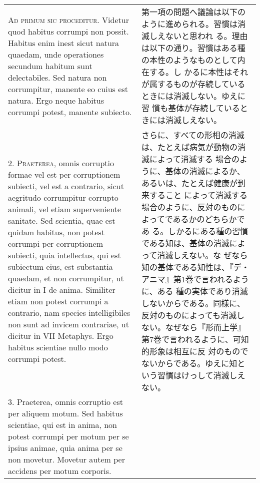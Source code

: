 \documentclass[10pt]{jsarticle} %
\begin{document}
\begin{longtable}{p{21em}p{21em}}


{\scshape Ad primum sic proceditur}. Videtur quod habitus corrumpi non
possit. Habitus enim inest sicut natura quaedam, unde operationes
secundum habitum sunt delectabiles. Sed natura non corrumpitur,
manente eo cuius est natura. Ergo neque habitus corrumpi potest,
manente subiecto.

&

第一項の問題へ議論は以下のように進められる。習慣は消滅しえないと思われ
る。理由は以下の通り。習慣はある種の本性のようなものとして内在する。し
かるに本性はそれが属するものが存続しているときには消滅しない。ゆえに習
慣も基体が存続しているときには消滅しえない。

\\



2. {\scshape Praeterea}, omnis corruptio formae vel est per
corruptionem subiecti, vel est a contrario, sicut aegritudo
corrumpitur corrupto animali, vel etiam superveniente sanitate. Sed
scientia, quae est quidam habitus, non potest corrumpi per
corruptionem subiecti, quia intellectus, qui est subiectum eius, est
substantia quaedam, et non corrumpitur, ut dicitur in I de
anima. Similiter etiam non potest corrumpi a contrario, nam species
intelligibiles non sunt ad invicem contrariae, ut dicitur in VII
Metaphys. Ergo habitus scientiae nullo modo corrumpi potest.


&

さらに、すべての形相の消滅は、たとえば病気が動物の消滅によって消滅する
場合のように、基体の消滅によるか、あるいは、たとえば健康が到来すること
によって消滅する場合のように、反対のものによってであるかのどちらかであ
る。しかるにある種の習慣である知は、基体の消滅によって消滅しえない。な
ぜなら知の基体である知性は、『デ・アニマ』第1巻で言われるように、ある
種の実体であり消滅しないからである。同様に、反対のものによっても消滅し
ない。なぜなら『形而上学』第7巻で言われるように、可知的形象は相互に反
対のものでないからである。ゆえに知という習慣はけっして消滅しえない。



\\



3. Praeterea, omnis corruptio est per aliquem motum. Sed habitus
scientiae, qui est in anima, non potest corrumpi per motum per se
ipsius animae, quia anima per se non movetur. Movetur autem per
accidens per motum corporis.



\end{longtable}
\end{document}
